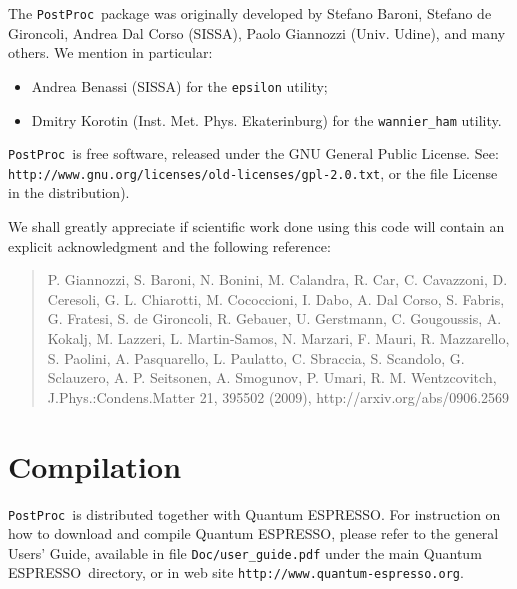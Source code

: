 \documentclass[12pt,a4paper]{article}
\def\qe{{\sc Quantum ESPRESSO}}
\def\PostProc{\texttt{PostProc}}
\begin{document}
The \PostProc\ package was originally developed by Stefano Baroni, 
Stefano de Gironcoli, Andrea Dal Corso (SISSA), Paolo Giannozzi 
(Univ. Udine), and many others. We mention in particular: 
\begin{itemize}
\item Andrea Benassi (SISSA) for the \texttt{epsilon} utility;
\item Dmitry Korotin (Inst. Met. Phys. Ekaterinburg) for the
\texttt{wannier\_ham} utility.
\end{itemize}

\PostProc\ is free software, released under the 
GNU General Public License. See:\\
\texttt{http://www.gnu.org/licenses/old-licenses/gpl-2.0.txt}, 
or the file License in the distribution).
    
We shall greatly appreciate if scientific work done using this code will 
contain an explicit acknowledgment and the following reference:
\begin{quote}
P. Giannozzi, S. Baroni, N. Bonini, M. Calandra, R. Car, C. Cavazzoni,
D. Ceresoli, G. L. Chiarotti, M. Cococcioni, I. Dabo, A. Dal Corso,
S. Fabris, G. Fratesi, S. de Gironcoli, R. Gebauer, U. Gerstmann,
C. Gougoussis, A. Kokalj, M. Lazzeri, L. Martin-Samos, N. Marzari,
F. Mauri, R. Mazzarello, S. Paolini, A. Pasquarello, L. Paulatto,
C. Sbraccia, S. Scandolo, G. Sclauzero, A. P. Seitsonen, A. Smogunov,
P. Umari, R. M. Wentzcovitch, J.Phys.:Condens.Matter 21, 395502 (2009),
http://arxiv.org/abs/0906.2569
\end{quote}
\section{Compilation}

\PostProc\ is distributed together with \qe.
For instruction on how to download and compile \qe, please refer 
to the general Users' Guide, available in file \texttt{Doc/user\_guide.pdf}
under the main \qe\ directory, or in web site 
\texttt{http://www.quantum-espresso.org}.
\end{document}
